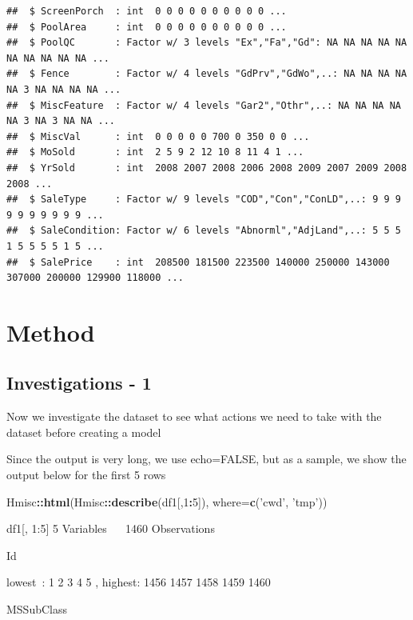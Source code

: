 \documentclass[
]{article}
\newenvironment{Shaded}{\begin{snugshade}}{\end{snugshade}}
\newcommand{\DataTypeTok}[1]{\textcolor[rgb]{0.13,0.29,0.53}{#1}}
\newcommand{\DecValTok}[1]{\textcolor[rgb]{0.00,0.00,0.81}{#1}}
\newcommand{\KeywordTok}[1]{\textcolor[rgb]{0.13,0.29,0.53}{\textbf{#1}}}
\newcommand{\NormalTok}[1]{#1}
\newcommand{\OperatorTok}[1]{\textcolor[rgb]{0.81,0.36,0.00}{\textbf{#1}}}
\newcommand{\StringTok}[1]{\textcolor[rgb]{0.31,0.60,0.02}{#1}}
\begin{document}
\begin{verbatim}
##  $ ScreenPorch  : int  0 0 0 0 0 0 0 0 0 0 ...
##  $ PoolArea     : int  0 0 0 0 0 0 0 0 0 0 ...
##  $ PoolQC       : Factor w/ 3 levels "Ex","Fa","Gd": NA NA NA NA NA NA NA NA NA NA ...
##  $ Fence        : Factor w/ 4 levels "GdPrv","GdWo",..: NA NA NA NA NA 3 NA NA NA NA ...
##  $ MiscFeature  : Factor w/ 4 levels "Gar2","Othr",..: NA NA NA NA NA 3 NA 3 NA NA ...
##  $ MiscVal      : int  0 0 0 0 0 700 0 350 0 0 ...
##  $ MoSold       : int  2 5 9 2 12 10 8 11 4 1 ...
##  $ YrSold       : int  2008 2007 2008 2006 2008 2009 2007 2009 2008 2008 ...
##  $ SaleType     : Factor w/ 9 levels "COD","Con","ConLD",..: 9 9 9 9 9 9 9 9 9 9 ...
##  $ SaleCondition: Factor w/ 6 levels "Abnorml","AdjLand",..: 5 5 5 1 5 5 5 5 1 5 ...
##  $ SalePrice    : int  208500 181500 223500 140000 250000 143000 307000 200000 129900 118000 ...
\end{verbatim}

\hypertarget{method}{%
\section{Method}\label{method}}

\hypertarget{investigations---1}{%
\subsection{Investigations - 1}\label{investigations---1}}

Now we investigate the dataset to see what actions we need to take with the dataset before creating a model

Since the output is very long, we use echo=FALSE, but as a sample, we show the output below for the first 5 rows

\begin{Shaded}
\begin{Highlighting}[]
\NormalTok{Hmisc}\OperatorTok{::}\KeywordTok{html}\NormalTok{(Hmisc}\OperatorTok{::}\KeywordTok{describe}\NormalTok{(df1[,}\DecValTok{1}\OperatorTok{:}\DecValTok{5}\NormalTok{]), }\DataTypeTok{where=}\KeywordTok{c}\NormalTok{(}\StringTok{'cwd'}\NormalTok{, }\StringTok{'tmp'}\NormalTok{))}
\end{Highlighting}
\end{Shaded}

{df1{[}, 1:5{]} 5 Variables   1460 Observations}

{Id}

{lowest~: 1 2 3 4 5 , highest: 1456 1457 1458 1459 1460}

{MSSubClass}
\end{document}

